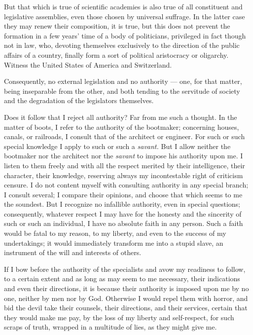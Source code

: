 \documentclass[12pt]{report}
\begin{document}
But that which is true of scientific academies is also true of all constituent and legislative assemblies, even those chosen by universal suffrage. In the latter case they may renew their composition, it is true, but this does not prevent the formation in a few years’ time of a body of politicians, privileged in fact though not in law, who, devoting themselves exclusively to the direction of the public affairs of a country, finally form a sort of political aristocracy or oligarchy. Witness the United States of America and Switzerland.


Consequently, no external legislation and no authority — one, for that matter, being inseparable from the other, and both tending to the servitude of society and the degradation of the legislators themselves.


Does it follow that I reject all authority? Far from me such a thought. In the matter of boots, I refer to the authority of the bootmaker; concerning houses, canals, or railroads, I consult that of the architect or engineer. For such or such special knowledge I apply to such or such a \emph{savant.} But I allow neither the bootmaker nor the architect nor the \emph{savant} to impose his authority upon me. I listen to them freely and with all the respect merited by their intelligence, their character, their knowledge, reserving always my incontestable right of criticism censure. I do not content myself with consulting authority in any special branch; I consult several; I compare their opinions, and choose that which seems to me the soundest. But I recognize no infallible authority, even in special questions; consequently, whatever respect I may have for the honesty and the sincerity of such or such an individual, I have no absolute faith in any person. Such a faith would be fatal to my reason, to my liberty, and even to the success of my undertakings; it would immediately transform me into a stupid slave, an instrument of the will and interests of others.


If I bow before the authority of the specialists and avow my readiness to follow, to a certain extent and as long as may seem to me necessary, their indications and even their directions, it is because their authority is imposed upon me by no one, neither by men nor by God. Otherwise I would repel them with horror, and bid the devil take their counsels, their directions, and their services, certain that they would make me pay, by the loss of my liberty and self-respect, for such scraps of truth, wrapped in a multitude of lies, as they might give me.
\end{document}

